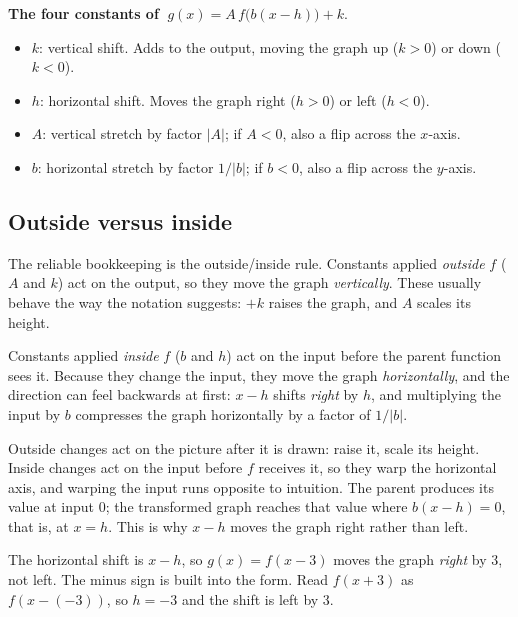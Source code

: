 \documentclass[12pt]{book}
\begin{document}
\begin{keyidea}
\textbf{The four constants of} $\;g(x)=A\,f\!\big(b(x-h)\big)+k$.
\begin{itemize}\setlength{\itemsep}{2pt}
  \item $k$: vertical shift. Adds to the output, moving the graph up ($k>0$) or
        down ($k<0$).
  \item $h$: horizontal shift. Moves the graph right ($h>0$) or left ($h<0$).
  \item $A$: vertical stretch by factor $|A|$; if $A<0$, also a flip across the
        $x$-axis.
  \item $b$: horizontal stretch by factor $1/|b|$; if $b<0$, also a flip across the
        $y$-axis.
\end{itemize}
\end{keyidea}

\subsection{Outside versus inside}

The reliable bookkeeping is the outside/inside rule. Constants applied \emph{outside}
$f$ ($A$ and $k$) act on the output, so they move the graph \emph{vertically}. These
usually behave the way the notation suggests: $+k$ raises the graph, and $A$ scales
its height.

Constants applied \emph{inside} $f$ ($b$ and $h$) act on the input before the parent
function sees it. Because they change the input, they move the graph
\emph{horizontally}, and the direction can feel backwards at first: $x-h$ shifts
\emph{right} by $h$, and multiplying the input by $b$ compresses the graph
horizontally by a factor of $1/|b|$.
\begin{visual}
Outside changes act on the picture after it is drawn: raise it, scale its height.
Inside changes act on the input before $f$ receives it, so they warp the horizontal
axis, and warping the input runs opposite to intuition. The parent produces its
value at input $0$; the transformed graph reaches that value where $b(x-h)=0$, that
is, at $x=h$. This is why $x-h$ moves the graph right rather than left.
\end{visual}

\begin{pitfall}
The horizontal shift is $x-h$, so $g(x)=f(x-3)$ moves the graph \emph{right} by 3,
not left. The minus sign is built into the form. Read $f(x+3)$ as $f(x-(-3))$, so
$h=-3$ and the shift is left by 3.
\end{pitfall}
\end{document}
